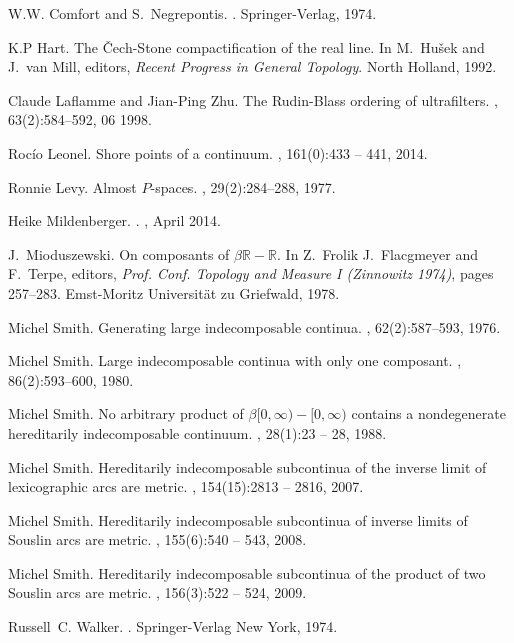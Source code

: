 \documentclass[12pt]{article}
\theoremstyle{plain}
\theoremstyle{definition}
\newcommand{\B}{\ensuremath{\beta}}
\newcommand{\0}{\ensuremath{\varnothing}}
\begin{document}
\begin{thebibliography}{10}
		W.W. Comfort and S.~Negrepontis.
		.
		\newblock Springer-Verlag, 1974.
		
		K.P Hart.
		\newblock The \v{C}ech-{S}tone compactification of the real line.
		\newblock In M.~Hu{\v{s}}ek and J.~van Mill, editors, {\em Recent Progress in
			General Topology}. North Holland, 1992.
		
		Claude Laflamme and Jian-Ping Zhu.
		\newblock The {R}udin-{B}lass ordering of ultrafilters.
		, 63(2):584--592, 06 1998.
		
		Roc{\'i}o Leonel.
		\newblock Shore points of a continuum.
		, 161(0):433 -- 441, 2014.
		
		Ronnie Levy.
		\newblock Almost {$P$}-spaces.
		, 29(2):284--288, 1977.
		
		Heike {Mildenberger}.
		.
		, April 2014.
		
		J.~Mioduszewski.
		\newblock On composants of {$\B \mathbb R - \mathbb R$}.
		\newblock In Z.~Frolik J.~Flacgmeyer and F.~Terpe, editors, {\em Prof. Conf.
			Topology and Measure I (Zinnowitz 1974)}, pages 257--283. Emst-Moritz
		Universit{\"a}t zu Griefwald, 1978.
		
		Michel Smith.
		\newblock Generating large indecomposable continua.
		, 62(2):587--593, 1976.
		
		Michel Smith.
		\newblock Large indecomposable continua with only one composant.
		, 86(2):593--600, 1980.
		
		Michel Smith.
		\newblock No arbitrary product of {$\beta[0, \infty) - [0, \infty)$} contains a
		nondegenerate hereditarily indecomposable continuum.
		, 28(1):23 -- 28, 1988.
		
		Michel Smith.
		\newblock Hereditarily indecomposable subcontinua of the inverse limit of
		lexicographic arcs are metric.
		, 154(15):2813 -- 2816, 2007.
		
		Michel Smith.
		\newblock Hereditarily indecomposable subcontinua of inverse limits of
		{S}ouslin arcs are metric.
		, 155(6):540 -- 543, 2008.
		
		Michel Smith.
		\newblock Hereditarily indecomposable subcontinua of the product of two
		{S}ouslin arcs are metric.
		, 156(3):522 -- 524, 2009.
		
		Russell~C. Walker.
		.
		\newblock Springer-Verlag New York, 1974.
		
	\end{thebibliography}
\end{document}
